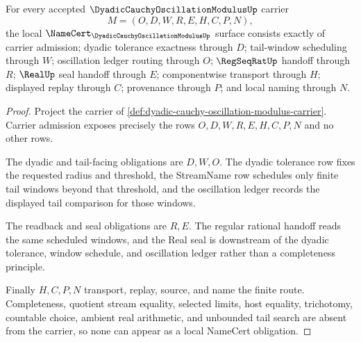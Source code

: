 \begin{theorem}
\label{thm:dyadic-cauchy-oscillation-modulus-namecert-obligations}
For every accepted $\DyadicCauchyOscillationModulusUp$ carrier
$$
M=(O,D,W,R,E,H,C,P,N),
$$
the local $\NameCert_{\DyadicCauchyOscillationModulusUp}$ surface consists exactly of carrier admission; dyadic tolerance exactness through $D$; tail-window scheduling through $W$; oscillation ledger routing through $O$; $\RegSeqRatUp$ handoff through $R$; $\RealUp$ seal handoff through $E$; componentwise transport through $H$; displayed replay through $C$; provenance through $P$; and local naming through $N$.
\end{theorem}
\begin{proof}
Project the carrier of \autoref{def:dyadic-cauchy-oscillation-modulus-carrier}. Carrier admission exposes precisely the rows $O,D,W,R,E,H,C,P,N$ and no other rows.

The dyadic and tail-facing obligations are $D,W,O$. The dyadic tolerance row fixes the requested radius and threshold, the StreamName row schedules only finite tail windows beyond that threshold, and the oscillation ledger records the displayed tail comparison for those windows.

The readback and seal obligations are $R,E$. The regular rational handoff reads the same scheduled windows, and the Real seal is downstream of the dyadic tolerance, window schedule, and oscillation ledger rather than a completeness principle.

Finally $H,C,P,N$ transport, replay, source, and name the finite route. Completeness, quotient stream equality, selected limits, host equality, trichotomy, countable choice, ambient real arithmetic, and unbounded tail search are absent from the carrier, so none can appear as a local NameCert obligation.
\end{proof}

